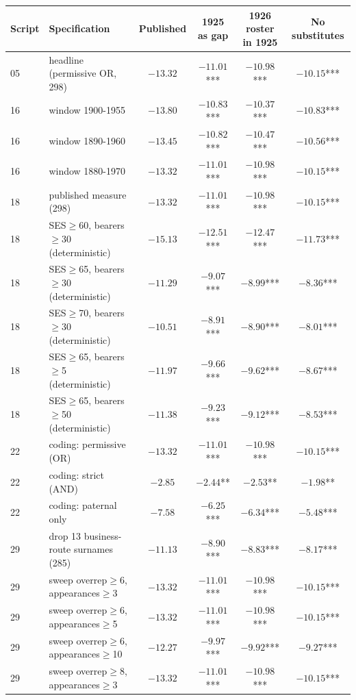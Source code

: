 \begin{tabular}{llcccc}
\toprule
Script & Specification & Published & 1925 as gap & 1926 roster in 1925 & No substitutes \\
\midrule
05 & headline (permissive OR, 298) & $-13.32$ & $-11.01$*** & $-10.98$*** & $-10.15$*** \\
16 & window 1900-1955 & $-13.80$ & $-10.83$*** & $-10.37$*** & $-10.83$*** \\
16 & window 1890-1960 & $-13.45$ & $-10.82$*** & $-10.47$*** & $-10.56$*** \\
16 & window 1880-1970 & $-13.32$ & $-11.01$*** & $-10.98$*** & $-10.15$*** \\
18 & published measure (298) & $-13.32$ & $-11.01$*** & $-10.98$*** & $-10.15$*** \\
18 & SES$\geq$60, bearers$\geq$30 (deterministic) & $-15.13$ & $-12.51$*** & $-12.47$*** & $-11.73$*** \\
18 & SES$\geq$65, bearers$\geq$30 (deterministic) & $-11.29$ & $-9.07$*** & $-8.99$*** & $-8.36$*** \\
18 & SES$\geq$70, bearers$\geq$30 (deterministic) & $-10.51$ & $-8.91$*** & $-8.90$*** & $-8.01$*** \\
18 & SES$\geq$65, bearers$\geq$5 (deterministic) & $-11.97$ & $-9.66$*** & $-9.62$*** & $-8.67$*** \\
18 & SES$\geq$65, bearers$\geq$50 (deterministic) & $-11.38$ & $-9.23$*** & $-9.12$*** & $-8.53$*** \\
22 & coding: permissive (OR) & $-13.32$ & $-11.01$*** & $-10.98$*** & $-10.15$*** \\
22 & coding: strict (AND) & $-2.85$ & $-2.44$** & $-2.53$** & $-1.98$** \\
22 & coding: paternal only & $-7.58$ & $-6.25$*** & $-6.34$*** & $-5.48$*** \\
29 & drop 13 business-route surnames (285) & $-11.13$ & $-8.90$*** & $-8.83$*** & $-8.17$*** \\
29 & sweep overrep$\geq$6, appearances$\geq$3 & $-13.32$ & $-11.01$*** & $-10.98$*** & $-10.15$*** \\
29 & sweep overrep$\geq$6, appearances$\geq$5 & $-13.32$ & $-11.01$*** & $-10.98$*** & $-10.15$*** \\
29 & sweep overrep$\geq$6, appearances$\geq$10 & $-12.27$ & $-9.97$*** & $-9.92$*** & $-9.27$*** \\
29 & sweep overrep$\geq$8, appearances$\geq$3 & $-13.32$ & $-11.01$*** & $-10.98$*** & $-10.15$*** \\

\end{tabular}
